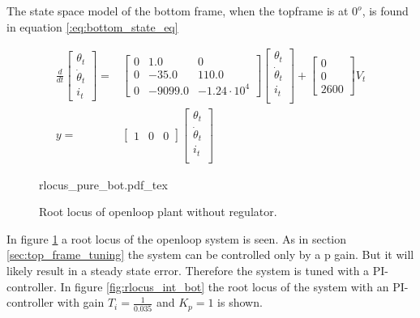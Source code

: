 \documentclass[../../../Main]{subfiles}
\begin{document}
The state space model of the bottom frame, when the topframe is at $0^o$, is found in equation \eqref{:eq:bottom_state_eq}

\begin{equation}
      \label{eq:bottom_state_eq}
      \begin{split}
      \frac{d}{dt}
    \begin{bmatrix}
        \theta_t \\
        \dot \theta_t \\
        i_t
    \end{bmatrix}
    =&
    \begin{bmatrix}0 & 1.0 & 0\\ 0 & -35.0 & 110.0\\ 0 & -9099.0 & -1.24\cdot10^4\end{bmatrix}
    \begin{bmatrix}
        \theta_t \\
        \dot \theta_t \\
        i_t \\
    \end{bmatrix}
    +
    \begin{bmatrix}
      0\\ 0\\ 2600
    \end{bmatrix}
    V_t
\\
      y =&
    \begin{bmatrix}
        1 & 0 & 0
    \end{bmatrix}
    \begin{bmatrix}
        \theta_t \\
        \dot \theta_t\\
        i_t\\
    \end{bmatrix}
    \end{split}
\end{equation}


\begin{figure}[H]
\centering
\def\svgwidth{\textwidth}
{rlocus_pure_bot.pdf_tex}
\caption{Root locus of openloop plant without regulator.}
\label{fig:rlocus_pure_bot}
\end{figure}

In figure \ref{fig:rlocus_pure_bot} a root locus of the openloop system is seen. As in section \ref{sec:top_frame_tuning} the system can be controlled only by a p gain. But it will likely result in a steady state error. Therefore the system is tuned with a PI-controller. In figure \ref{fig:rlocus_int_bot} the root locus of the system with an PI-controller with gain $T_i = \frac{1}{0.035}$ and $K_p= 1$ is shown.
\end{document}
